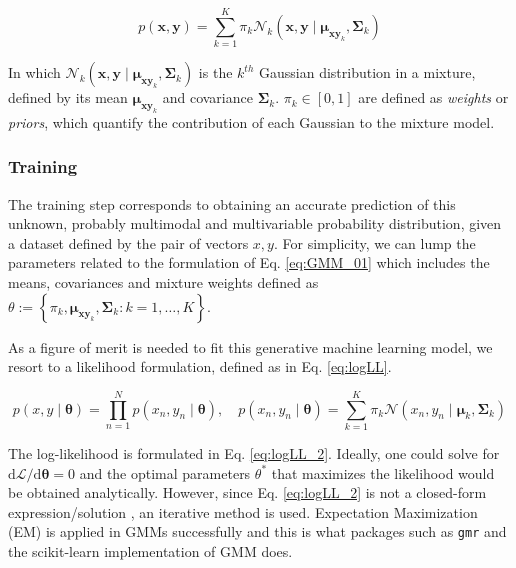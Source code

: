 \documentclass{achemso}
\begin{document}
\begin{equation} \label{eq:GMM_01}
p(\boldsymbol{x}, \boldsymbol{y})=\sum_{k=1}^K \pi_k \mathcal{N}_k\left(\boldsymbol{x}, \boldsymbol{y} \mid \boldsymbol{\mu}_{\boldsymbol{x} \boldsymbol{y}_k}, \boldsymbol{\Sigma}_{k}\right)
\end{equation}

\noindent In which \(\mathcal{N}_k\left(\boldsymbol{x}, \boldsymbol{y} \mid \boldsymbol{\mu}_{\boldsymbol{x} \boldsymbol{y}_k}, \boldsymbol{\Sigma}_{k}\right)\) is the \(k^{th}\) Gaussian distribution in a mixture, defined by its mean \(\boldsymbol{\mu}_{\boldsymbol{x} \boldsymbol{y}_k}\) and covariance \(\boldsymbol{\Sigma}_{k}\). \(\pi_k \in [0,1]\) are defined as \textit{weights} or \textit{priors}, which quantify the contribution of each Gaussian to the mixture model.

\subsubsection{Training}

The training step corresponds to obtaining an accurate prediction of this unknown, probably multimodal and multivariable probability distribution, given a dataset defined by the pair of vectors \(x, y\). For simplicity, we can lump the parameters related to the formulation of Eq. \ref{eq:GMM_01} which includes the means, covariances and mixture weights defined as \(\theta := \left\{\pi_k, \boldsymbol{\mu}_{\boldsymbol{x} \boldsymbol{y}_k}, \boldsymbol{\Sigma}_{k}: k=1, \ldots, K\right\}\).

As a figure of merit is needed to fit this generative machine learning model, we resort to a likelihood formulation, defined as in Eq. \ref{eq:logLL}.

\begin{equation} \label{eq:logLL}
p(x,y \mid \boldsymbol{\theta})=\prod_{n=1}^N p\left(x_n,y_n \mid \boldsymbol{\theta}\right), \quad p\left(x_n,y_n \mid \boldsymbol{\theta}\right)=\sum_{k=1}^K \pi_k \mathcal{N}\left(x_n,y_n \mid \boldsymbol{\mu}_k, \boldsymbol{\Sigma}_k\right)
\end{equation}

The log-likelihood \cite{deisenroth2020mathematicsML} is formulated in Eq. \ref{eq:logLL_2}. Ideally, one could solve for \(\mathrm{d} \mathcal{L} / \mathrm{d} \boldsymbol{\theta} = 0\) and the optimal parameters \(\theta^*\) that maximizes the likelihood would be obtained analytically. However, since Eq. \ref{eq:logLL_2} is not a closed-form expression/solution \cite{deisenroth2020mathematicsML}, an iterative method is used. Expectation Maximization (EM) is applied in GMMs successfully and this is what packages such as \texttt{gmr} \cite{Fabisch2021} and the scikit-learn \cite{scikit-learn} implementation of GMM does.
\end{document}
